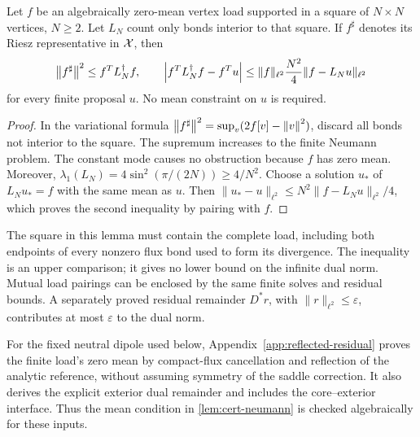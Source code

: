 \begin{lemma}\label{lem:cert-neumann}
Let $f$ be an algebraically zero-mean vertex load supported in a square
of $N\times N$ vertices, $N\ge2$. Let $L_N$ count only bonds interior to that
square. If $f^\sharp$ denotes its Riesz representative in $\mathcal X$, then
\begin{equation}\label{eq:cert-neumann}
 \left\lVert f^\sharp\right\rVert^2\le f^TL_N^\dagger f,
 \qquad
 \left|f^TL_N^\dagger f-f^Tu\right|
 \le \|f\|_{\ell^2}\frac{N^2}{4}\|f-L_Nu\|_{\ell^2}
\end{equation}
for every finite proposal $u$. No mean constraint on $u$ is required.
\end{lemma}
\begin{proof}
In the variational formula
$\left\lVert f^\sharp\right\rVert^2=\sup_v(2f[v]-\left\lVert v\right\rVert^2)$, discard all bonds not
interior to the square. The supremum increases to the finite Neumann
problem. The constant mode causes no obstruction because $f$ has zero
mean. Moreover,
$\lambda_1(L_N)=4\sin^2(\pi/(2N))\ge4/N^2$.
Choose a solution $u_*$ of $L_Nu_*=f$ with the same mean as $u$.
Then $\|u_*-u\|_{\ell^2}\le N^2\|f-L_Nu\|_{\ell^2}/4$, which proves the
second inequality by pairing with $f$.
\end{proof}

The square in this lemma must contain the complete load, including both
endpoints of every nonzero flux bond used to form its divergence. The
inequality is an upper comparison; it gives no lower bound on the
infinite dual norm. Mutual load pairings can be enclosed by the same
finite solves and residual bounds. A separately proved residual
remainder $D^*r$, with $\|r\|_{\ell^2}\le\varepsilon$, contributes
at most $\varepsilon$ to the dual norm.

For the fixed neutral dipole used below, Appendix~\ref{app:reflected-residual}
proves the finite load's zero mean by compact-flux cancellation and reflection
of the analytic reference, without assuming symmetry of the saddle correction.
It also derives the explicit exterior dual remainder and includes the
core--exterior interface. Thus the mean condition in
\cref{lem:cert-neumann} is checked algebraically for these inputs.

